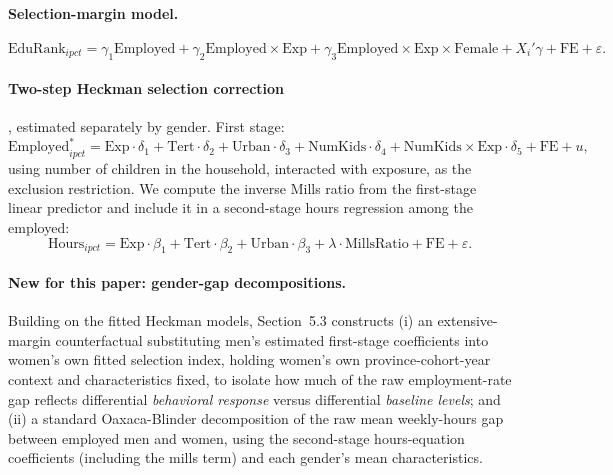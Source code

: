 \documentclass[11pt]{article}
\begin{document}
\paragraph{Selection-margin model.}
\begin{equation}
\text{EduRank}_{ipct} = \gamma_1 \text{Employed} + \gamma_2 \text{Employed}\times\text{Exp} + \gamma_3 \text{Employed}\times\text{Exp}\times\text{Female} + X_i'\gamma + \text{FE} + \varepsilon.
\end{equation}

\paragraph{Two-step Heckman selection correction}, estimated separately by gender. First stage:
\begin{equation}
\text{Employed}^*_{ipct} = \text{Exp}\cdot\delta_1 + \text{Tert}\cdot\delta_2 + \text{Urban}\cdot\delta_3 + \text{NumKids}\cdot\delta_4 + \text{NumKids}\times\text{Exp}\cdot\delta_5 + \text{FE} + u,
\end{equation}
using number of children in the household, interacted with exposure, as the exclusion restriction. We compute the inverse Mills ratio from the first-stage linear predictor and include it in a second-stage hours regression among the employed:
\begin{equation}
\text{Hours}_{ipct} = \text{Exp}\cdot\beta_1 + \text{Tert}\cdot\beta_2 + \text{Urban}\cdot\beta_3 + \lambda \cdot \text{MillsRatio} + \text{FE} + \varepsilon.
\end{equation}

\paragraph{New for this paper: gender-gap decompositions.} Building on the fitted Heckman models, Section~5.3 constructs (i) an extensive-margin counterfactual substituting men's estimated first-stage coefficients into women's own fitted selection index, holding women's own province-cohort-year context and characteristics fixed, to isolate how much of the raw employment-rate gap reflects differential \emph{behavioral response} versus differential \emph{baseline levels}; and (ii) a standard Oaxaca-Blinder decomposition of the raw mean weekly-hours gap between employed men and women, using the second-stage hours-equation coefficients (including the mills term) and each gender's mean characteristics.

\end{document}
